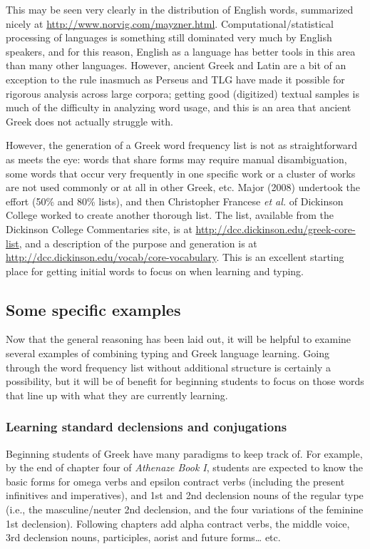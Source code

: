 \documentclass[11pt]{article}
\begin{document}
This may be seen very clearly in the distribution of English words, summarized nicely at \url{http://www.norvig.com/mayzner.html}. Computational/statistical processing of languages is something still dominated very much by English speakers, and for this reason, English as a language has better tools in this area than many other languages. However, ancient Greek and Latin are a bit of an exception to the rule inasmuch as Perseus and TLG have made it possible for rigorous analysis across large corpora; getting good (digitized) textual samples is much of the difficulty in analyzing word usage, and this is an area that ancient Greek does not actually struggle with.

However, the generation of a Greek word frequency list is not as straightforward as meets the eye: words that share forms may require manual disambiguation, some words that occur very frequently in one specific work or a cluster of works are not used commonly or at all in other Greek, etc. Major (2008) undertook the effort (50\% and 80\% lists), and then Christopher Francese \emph{et al.} of Dickinson College worked to create another thorough list. The list, available from the Dickinson College Commentaries site, is at \url{http://dcc.dickinson.edu/greek-core-list}, and a description of the purpose and generation is at \url{http://dcc.dickinson.edu/vocab/core-vocabulary}. This is an excellent starting place for getting initial words to focus on when learning and typing.

\subsection{Some specific examples}
\label{sec:orgca6a89f}

Now that the general reasoning has been laid out, it will be helpful to examine several examples of combining typing and Greek language learning. Going through the word frequency list without additional structure is certainly a possibility, but it will be of benefit for beginning students to focus on those words that line up with what they are currently learning. 

\subsubsection{Learning standard declensions and conjugations}
\label{sec:org2757794}

Beginning students of Greek have many paradigms to keep track of. For example, by the end of chapter four of \emph{Athenaze Book I}, students are expected to know the basic forms for omega verbs and epsilon contract verbs (including the present infinitives and imperatives), and 1st and 2nd declension nouns of the regular type (i.e., the masculine/neuter 2nd declension, and the four variations of the feminine 1st declension). Following chapters add alpha contract verbs, the middle voice, 3rd declension nouns, participles, aorist and future forms\ldots{} etc.
\end{document}
